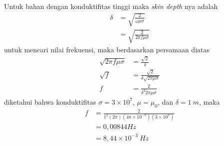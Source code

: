 Untuk bahan dengan konduktifitas tinggi maka \textit{skin depth} nya adalah
\begin{align*}
    \delta &= \sqrt{\frac{2}{\omega \mu \sigma}}\\
           &= \sqrt{\frac{2}{2 \pi f \mu \sigma}}
\end{align*}
untuk mencari nilai frekuensi, maka berdasarkan persamaan diatas
\begin{align*}
    \sqrt{2\pi f \mu \sigma} &= \frac{\sqrt{2}}{\delta}\\
    \sqrt{f} &= \frac{\sqrt{2}}{\delta\sqrt{2\pi\mu \sigma}}\\
    f &= \frac{2}{\delta^2 2\pi\mu \sigma}
\end{align*}
diketahui bahwa konduktifitas $\sigma=3\times 10^7$, $\mu=\mu_0$, dan $\delta = 1\ \si{m}$, maka
\begin{align*}
    f&=\frac{2}{1^2 (2\pi) (4\pi\times 10^{-7}) (3\times 10^7)}\\
     &=0,00844 Hz\\
     &=8,44 \times 10^{-3}\ \si{Hz}
\end{align*}


